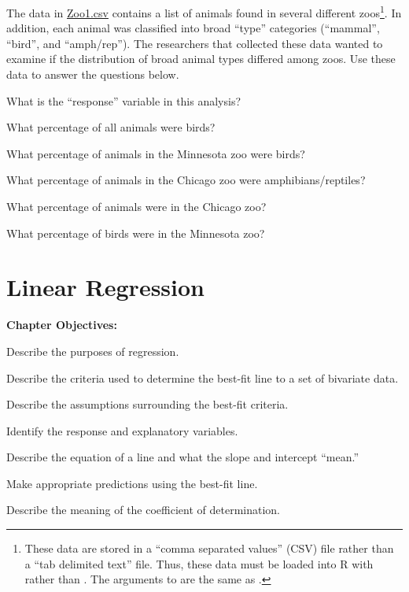 \documentclass[10pt,openany]{book}\usepackage[]{graphicx}\usepackage[]{color}
\begin{document}
\begin{exsection}
  \item \label{revex:cbEDAZoo1} \rhw{} The data in \href{}{Zoo1.csv} contains a list of animals found in several different zoos\footnote{These data are stored in a ``comma separated values'' (CSV) file rather than a ``tab delimited text'' file.  Thus, these data must be loaded into R with  rather than .  The arguments to  are the same as .}.  In addition, each animal was classified into broad ``type'' categories (``mammal'', ``bird'', and ``amph/rep'').  The researchers that collected these data wanted to examine if the distribution of broad animal types differed among zoos.  Use these data to answer the questions below.
  \begin{Enumerate}
    \item What is the ``response'' variable in this analysis?
    \item What percentage of all animals were birds?
    \item What percentage of animals in the Minnesota zoo were birds?
    \item What percentage of animals in the Chicago zoo were amphibians/reptiles?
    \item What percentage of animals were in the Chicago zoo?
    \item What percentage of birds were in the Minnesota zoo?
  \end{Enumerate}
\end{exsection}



\chapter{Linear Regression}  \label{chap:Regress}
\begin{ChapObj}{\boxwidth}
  \textbf{Chapter Objectives:}
  \begin{Enumerate}
    \item Describe the purposes of regression.
    \item Describe the criteria used to determine the best-fit line to a set of bivariate data.
    \item Describe the assumptions surrounding the best-fit criteria.
    \item Identify the response and explanatory variables.
    \item Describe the equation of a line and what the slope and intercept ``mean.''
    \item Make appropriate predictions using the best-fit line.
    \item Describe the meaning of the coefficient of determination.
  \end{Enumerate}
\end{ChapObj}
\end{document}
